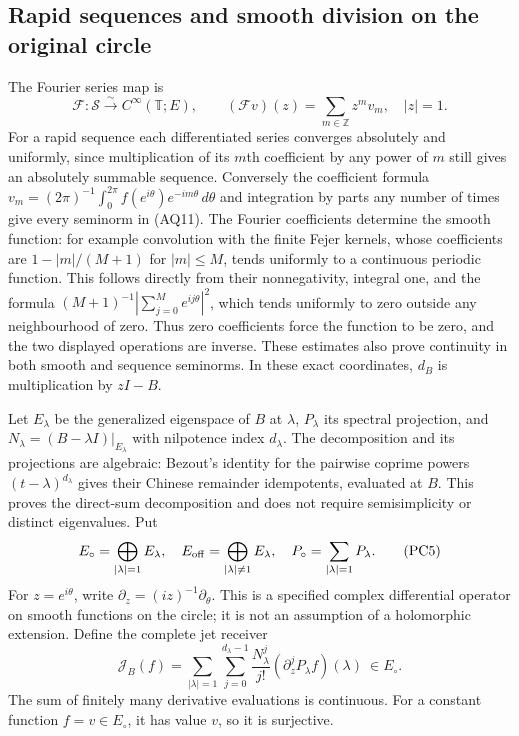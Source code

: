 \documentclass[11pt,a4paper]{article}
\theoremstyle{definition}\newtheorem{definition}[theorem]{Definition}
\begin{document}
\subsection{Rapid sequences and smooth division on the original circle}
The Fourier series map is
\[
 \mathcal F:\mathscr S\xrightarrow{\sim}C^\infty(\mathbb T;E),
 \qquad (\mathcal Fv)(z)=\sum_{m\in\mathbb Z}z^mv_m,
 \quad |z|=1.
 \tag{PC4}
\]
For a rapid sequence each differentiated series converges absolutely
and uniformly, since multiplication of its $m$th coefficient by any
power of $m$ still gives an absolutely summable sequence. Conversely
the coefficient formula
$v_m=(2\pi)^{-1}\int_0^{2\pi}f(e^{i\theta})e^{-im\theta}\,d\theta$
and integration by parts any number of times give every seminorm in
(AQ11). The Fourier coefficients determine the smooth function: for
example convolution with the finite Fejer kernels, whose coefficients
are $1-|m|/(M+1)$ for $|m|\le M$, tends uniformly to a continuous
periodic function. This follows directly from their nonnegativity,
integral one, and the formula
$(M+1)^{-1}|\sum_{j=0}^Me^{ij\theta}|^2$, which tends uniformly to
zero outside any neighbourhood of zero. Thus zero coefficients force
the function to be zero, and the two displayed operations are inverse.
These estimates also prove continuity in both smooth and sequence
seminorms. In these exact coordinates, $d_B$ is multiplication by
$zI-B$.

Let $E_\lambda$ be the generalized eigenspace of $B$ at $\lambda$,
$P_\lambda$ its spectral projection, and
$N_\lambda=(B-\lambda I)|_{E_\lambda}$ with nilpotence index
$d_\lambda$. The decomposition and its projections are algebraic:
Bezout's identity for the pairwise coprime powers
$(t-\lambda)^{d_\lambda}$ gives their Chinese remainder idempotents,
evaluated at $B$. This proves the direct-sum decomposition and does
not require semisimplicity or distinct eigenvalues. Put
\[
 E_\circ=\bigoplus_{|\lambda|=1}E_\lambda,
 \quad E_{\rm off}=\bigoplus_{|\lambda|\ne1}E_\lambda,
 \quad P_\circ=\sum_{|\lambda|=1}P_\lambda.
 \tag{PC5}
\]
For $z=e^{i\theta}$, write $\partial_z=(iz)^{-1}\partial_\theta$.
This is a specified complex differential operator on smooth functions
on the circle; it is not an assumption of a holomorphic extension.
Define the complete jet receiver
\[
 \mathcal J_B(f)=
 \sum_{|\lambda|=1}\sum_{j=0}^{d_\lambda-1}
   \frac{N_\lambda^j}{j!}
   (\partial_z^j P_\lambda f)(\lambda)\ \in E_\circ.
 \tag{PC6}
\]
The sum of finitely many derivative evaluations is continuous. For
a constant function $f=v\in E_\circ$, it has value $v$, so it is
surjective.
\end{document}
